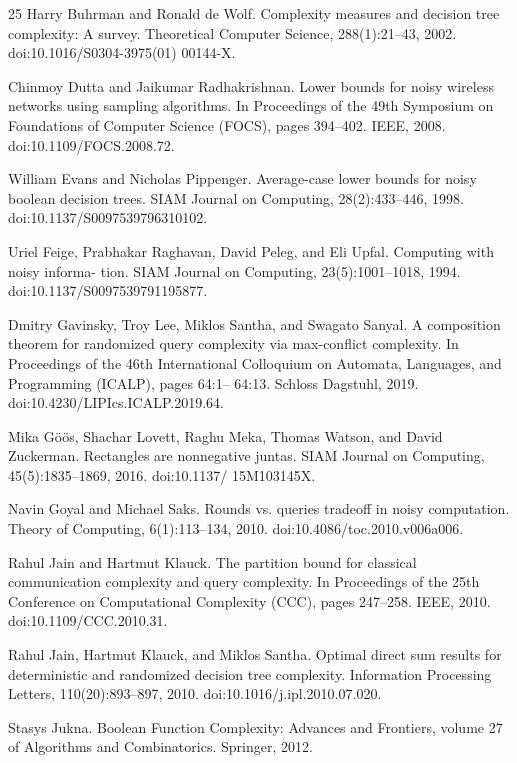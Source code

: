 \documentclass[10pt,a4paper]{article}
\begin{document}
\begin{thebibliography}{25}
Harry Buhrman and Ronald de Wolf. Complexity measures and decision tree complexity: A survey. Theoretical Computer Science, 288(1):21–43, 2002. doi:10.1016/S0304-3975(01) 00144-X.

Chinmoy Dutta and Jaikumar Radhakrishnan. Lower bounds for noisy wireless networks using sampling algorithms. In Proceedings of the 49th Symposium on Foundations of Computer Science (FOCS), pages 394–402. IEEE, 2008. doi:10.1109/FOCS.2008.72.

William Evans and Nicholas Pippenger. Average-case lower bounds for noisy boolean decision trees. SIAM Journal on Computing, 28(2):433–446, 1998. doi:10.1137/S0097539796310102.

Uriel Feige, Prabhakar Raghavan, David Peleg, and Eli Upfal. Computing with noisy informa- tion. SIAM Journal on Computing, 23(5):1001–1018, 1994. doi:10.1137/S0097539791195877.

Dmitry Gavinsky, Troy Lee, Miklos Santha, and Swagato Sanyal. A composition theorem for randomized query complexity via max-conflict complexity. In Proceedings of the 46th International Colloquium on Automata, Languages, and Programming (ICALP), pages 64:1– 64:13. Schloss Dagstuhl, 2019. doi:10.4230/LIPIcs.ICALP.2019.64.

Mika Göös, Shachar Lovett, Raghu Meka, Thomas Watson, and David Zuckerman. Rectangles are nonnegative juntas. SIAM Journal on Computing, 45(5):1835–1869, 2016. doi:10.1137/ 15M103145X.

Navin Goyal and Michael Saks. Rounds vs. queries tradeoff in noisy computation. Theory of Computing, 6(1):113–134, 2010. doi:10.4086/toc.2010.v006a006.

Rahul Jain and Hartmut Klauck. The partition bound for classical communication complexity and query complexity. In Proceedings of the 25th Conference on Computational Complexity (CCC), pages 247–258. IEEE, 2010. doi:10.1109/CCC.2010.31.

Rahul Jain, Hartmut Klauck, and Miklos Santha. Optimal direct sum results for deterministic and randomized decision tree complexity. Information Processing Letters, 110(20):893–897, 2010. doi:10.1016/j.ipl.2010.07.020.

Stasys Jukna. Boolean Function Complexity: Advances and Frontiers, volume 27 of Algorithms and Combinatorics. Springer, 2012.


\end{thebibliography}
\end{document}
